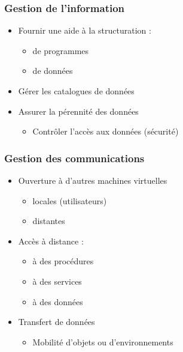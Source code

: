 \begin{frame}
 \frametitle{Gestion de l'information}
 \begin{itemize}
 \item Fournir une aide à la structuration :
 \begin{itemize}
 \item de programmes
 \item de données
 \end{itemize}
 \item Gérer les catalogues de données
 \item Assurer la pérennité des données
 \begin{itemize}
  \item Contrôler l'accès aux données (sécurité)
 \end{itemize}
 \end{itemize}
 \end{frame}


\begin{frame}
 \frametitle{Gestion des communications}
 \begin{itemize}
 \item Ouverture à d'autres machines virtuelles
 \begin{itemize}
 \item locales (utilisateurs)
 \item distantes
 \end{itemize}
 \item Accès à distance :
 \begin{itemize}
\item à des procédures
\item à des services
\item à des données
\end{itemize}
 \item Transfert de données
 \begin{itemize}
  \item Mobilité d'objets ou d'environnements
\end{itemize}
\end{itemize}
\end{frame}


